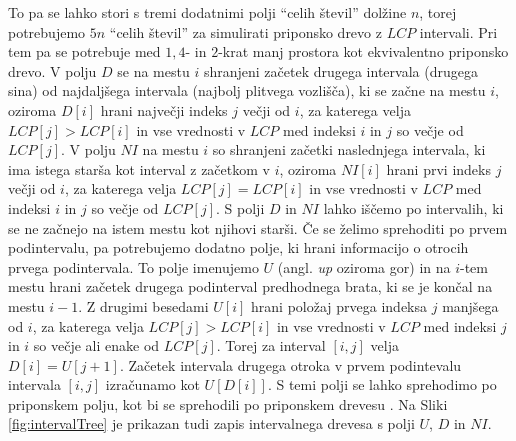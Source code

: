 To pa se lahko stori s tremi dodatnimi polji \enquote{celih števil} dolžine $n$, torej potrebujemo $5n$ \enquote{celih števil} za simulirati priponsko drevo z $LCP$ intervali. Pri tem pa se potrebuje med $1,4$- in $2$-krat manj prostora kot ekvivalentno priponsko drevo. V polju $D$ se na mestu $i$ shranjeni začetek drugega intervala (drugega sina) od najdaljšega intervala (najbolj plitvega vozlišča), ki se začne na mestu $i$, oziroma $D[i]$ hrani največji indeks $j$ večji od $i$, za katerega velja $LCP[j]>LCP[i]$ in vse vrednosti v $LCP$ med indeksi $i$ in $j$ so večje od $LCP[j]$. V polju $NI$ na mestu $i$ so shranjeni začetki naslednjega intervala, ki ima istega starša kot interval z začetkom v $i$, oziroma $NI[i]$ hrani prvi indeks $j$ večji od $i$, za katerega velja $LCP[j]=LCP[i]$ in vse vrednosti v $LCP$ med indeksi $i$ in $j$ so večje od $LCP[j]$. S polji $D$ in $NI$ lahko iščemo po intervalih, ki se ne začnejo na istem mestu kot njihovi starši. Če se želimo sprehoditi po prvem podintervalu, pa potrebujemo dodatno polje, ki hrani informacijo o otrocih prvega podintervala. To polje imenujemo $U$ (angl. \textit{up} oziroma gor) in na $i$-tem mestu hrani začetek drugega podinterval predhodnega brata, ki se je končal na mestu $i-1$. Z drugimi besedami $U[i]$ hrani položaj prvega indeksa $j$ manjšega od $i$, za katerega velja $LCP[j]>LCP[i]$ in vse vrednosti v $LCP$ med indeksi $j$ in $i$ so večje ali enake od $LCP[j]$. Torej za interval $[i,j]$ velja $D[i]=U[j+1]$. Začetek intervala drugega otroka v prvem podintevalu intervala $[i,j]$ izračunamo kot $U[D[i]]$. S temi polji se lahko sprehodimo po priponskem polju, kot bi se sprehodili po priponskem drevesu \cite{Abouelhoda2004}. Na Sliki \ref{fig:intervalTree} je prikazan tudi zapis intervalnega drevesa s polji $U$, $D$ in $NI$. 

